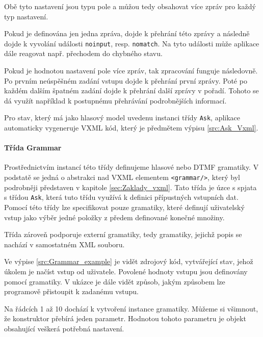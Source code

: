\documentclass[ing,male,java,dept460]{diploma}						%
\begin{document}
Obě tyto nastavení jsou typu pole a můžou tedy obsahovat více zpráv pro každý typ nastavení.

Pokud je definována jen jedna zpráva, dojde k přehrání této zprávy a následně dojde k vyvolání události \texttt{noinput}, resp. \texttt{nomatch}. Na tyto události může aplikace dále reagovat např. přechodem do chybného stavu.

Pokud je hodnotou nastavení pole více zpráv, tak zpracování funguje následovně. Po prvním neúspěšném zadání vstupu dojde k přehrání první zprávy. Poté po každém dalším špatném zadání dojde k přehrání další zprávy v pořadí. Tohoto se dá využít například k postupnému přehrávání podrobnějších informací.

Pro stav, který má jako hlasový model uvedenu instanci třídy \texttt{Ask}, aplikace automaticky vygeneruje VXML kód, který je předmětem výpisu \ref{src:Ask_Vxml}.



\paragraph{Třída Grammar}
\label{sec:Grammar}
Prostřednictvím instancí této třídy definujeme hlasové nebo DTMF gramatiky. V podstatě se jedná o abstrakci nad VXML elementem \texttt{<grammar/>}, který byl podrobněji představen v kapitole \ref{sec:Zaklady_vxml}. Tato třída je úzce s spjata s třídou \texttt{Ask}, která tuto třídu využívá k definici přípustných vstupních dat. Pomocí této třídy lze specifikovat pouze gramatiky, které definují uživatelský vstup jako výběr jedné položky z předem definované konečné množiny.

Třída zároveň podporuje externí gramatiky, tedy gramatiky, jejichž popis se nachází v samostatném XML souboru.

Ve výpise \ref{src:Grammar_example} je vidět zdrojový kód, vytvářející stav, jehož úkolem je načíst vstup od uživatele. Povolené hodnoty vstupu jsou definovány pomocí gramatiky. V ukázce je dále vidět způsob, jakým způsobem lze programově přistoupit k zadanému vstupu.



Na řádcích 1 až 10 dochází k vytvoření instance gramatiky. Můžeme si všimnout, že konstruktor přebírá jeden parametr. Hodnotou tohoto parametru je objekt obsahující veškerá potřebná nastavení.
\end{document}
